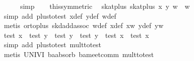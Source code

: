 \begin{isabellebody}
\ \ \ \ \isamarkupfalse%
\ simp\isanewline
\ \ \isamarkupfalse%
\ this{}symmetric{}\ \isamarkupfalse%
\ {}skat{}plus\ {}skat{}plus\ x\ y{}\ w\ {}\ w{}\isanewline
\ \ \ \ \isamarkupfalse%
\ {}simp\ add{}\ plus{}to{}test\ x{}{}def\ y{}{}def\ w{}{}def{}\isanewline
\ \ \ \ \isamarkupfalse%
\ {}metis\ or{}to{}plus\ skd{}add{}assoc\ w{}{}def\ x{}{}def\ xw\ y{}{}def\ yw{}\isanewline
{}\isamarkupfalse%
%
\endisatagproof
{\isafoldproof}%
%
\isadelimproof
\isanewline
%
\endisadelimproof
\isanewline
{}\isamarkupfalse%
\ {}test\ x\ {}\ test\ y\ {}\ test\ y\ {}\ test\ y\ {}\ test\ x\ {}\ test\ x{}\isanewline
%
\isadelimproof
\ \ %
\endisadelimproof
%
\isatagproof
{}\isamarkupfalse%
\ {}simp\ add{}\ plus{}to{}test\ mult{}to{}test{}\isanewline
\ \ \isamarkupfalse%
\ {}metis\ UNIV{}I\ ba{}absorb{}\ ba{}meet{}comm\ mult{}to{}test{}%

\end{isabellebody}
